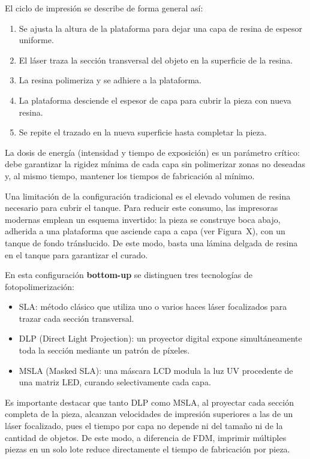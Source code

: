 El ciclo de impresión se describe de forma general así:
\begin{enumerate}
	\item Se ajusta la altura de la plataforma para dejar una capa de resina de espesor uniforme.
	\item El láser traza la sección transversal del objeto en la superficie de la resina.
	\item La resina polimeriza y se adhiere a la plataforma.
	\item La plataforma desciende el espesor de capa para cubrir la pieza con nueva resina.
	\item Se repite el trazado en la nueva superficie hasta completar la pieza.
\end{enumerate}

La dosis de energía (intensidad y tiempo de exposición) es un parámetro crítico: debe garantizar la rigidez mínima de cada capa sin polimerizar zonas no deseadas y, al mismo tiempo, mantener los tiempos de fabricación al mínimo.

Una limitación de la configuración tradicional es el elevado volumen de resina necesario para cubrir el tanque. Para reducir este consumo, las impresoras modernas emplean un esquema invertido: la pieza se construye boca abajo, adherida a una plataforma que asciende capa a capa (ver Figura~X), con un tanque de fondo tránslucido. De este modo, basta una lámina delgada de resina en el tanque para garantizar el curado.

En esta configuración \textbf{bottom-up} se distinguen tres tecnologías de fotopolimerización:

\begin{itemize}
	\item SLA: método clásico que utiliza uno o varios haces láser focalizados para trazar cada sección transversal.
	\item DLP (Direct Light Projection): un proyector digital expone simultáneamente toda la sección mediante un patrón de píxeles.
	\item MSLA (Masked SLA): una máscara LCD modula la luz UV procedente de una matriz LED, curando selectivamente cada capa.
\end{itemize}

Es importante destacar que tanto DLP como MSLA, al proyectar cada sección completa de la pieza, alcanzan velocidades de impresión superiores a las de un láser focalizado, pues el tiempo por capa no depende ni del tamaño ni de la cantidad de objetos. De este modo, a diferencia de FDM, imprimir múltiples piezas en un solo lote reduce directamente el tiempo de fabricación por pieza.

